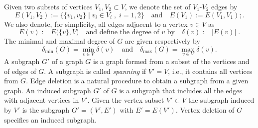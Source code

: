 \documentclass[a4paper,onecolumn,accepted=2024-12-14]{quantumarticle}
\theoremstyle{plain}
\newcommand{\quadtext}[1]{\quad\text{#1}\quad}
\begin{document}
Given two subsets of vertices $V_1,V_2\subset V$, we denote the set of $V_1$-$V_2$ edges by
\begin{equation}
E(V_1,V_2):=\{ \{v_1,v_2\} \mid v_i \in V_i \;,\; i=1,2 \}
 \quadtext{and}
 E(V_1):=E(V_1,V_1);.
\end{equation}
We also denote, for simplicity, all edges adjacent to a vertex $v\in V$ as
\begin{equation}
 E(v):=E\big(\{v\},V\big)\quadtext{and define the degree of $v$ by} \delta(v):=|E(v)|\;.
\end{equation}
The minimal and maximal degree of $G$ are given respectively by
\begin{equation}\label{maxmindegree}
\delta_{\mathrm{min}}(G)=\min_{v\in V}\delta(v)
\quadtext{and}
\delta_{\mathrm{max}}(G)=\max_{v\in V}\delta(v).
\end{equation}
A subgraph $G'$ of a graph $G$ is a graph formed from a subset of the vertices and of edges of $G$. A subgraph is called \textit{spanning} if
$V'=V$, i.e., it contains all vertices from $G$.
Edge deletion is a natural procedure to obtain a subgraph from a given graph. An induced subgraph $G'$ of $G$ is a subgraph that includes all the edges with adjacent vertices in $V'$. Given the vertex subset
$V'\subset V$ the subgraph induced by $V'$ is the subgraph $G'=(V',E')$ with
$E'=E(V')$. Vertex deletion of $G$ specifies an induced subgraph.
\end{document}
